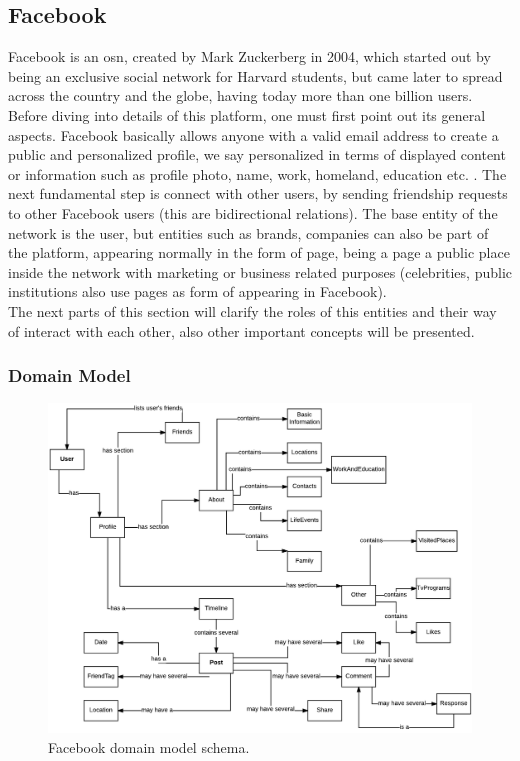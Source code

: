\subsection{Facebook}

Facebook is an \gls{osn}, created by Mark Zuckerberg in 2004, which started out by being an exclusive social network for Harvard students, but came later to spread across
the country and the globe, having today more than one billion users.\\
\indent Before diving into details of this platform, one must first point out its general aspects. Facebook basically allows anyone with a valid email address to create a public and personalized profile,
we say personalized in terms of displayed content or information such as profile photo, name, work, homeland, education etc. .
The next fundamental step is connect with other users, by sending friendship requests to other Facebook users (this are bidirectional relations).
The base entity of the network is the user, but entities such as brands, companies can also be part of the platform, appearing normally
in the form of page, being a page a public place inside the network with marketing or business related purposes (celebrities, public institutions also use pages as form of appearing in Facebook).\\
\indent The next parts of this section will clarify the roles of this entities and their way of interact with each other, also other important concepts will be presented.

\subsubsection*{Domain Model}

\begin{figure}[h!]
  \hspace*{-1in}
  \includegraphics[width=1.2\textwidth]{img/facebook-domain-model.png}
\caption{\label{img:fbdomain} Facebook domain model schema.}
\end{figure}

